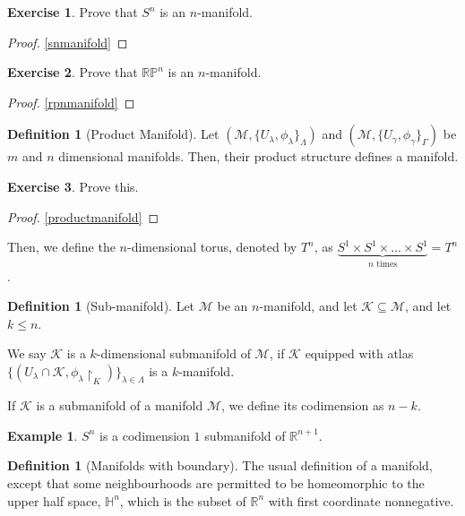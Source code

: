\documentclass[12pt]{report}
\theoremstyle{definition}
\newtheorem{example}[thm]{Example}
\newtheorem{defn}[thm]{Definition}
\newtheorem*{exercise}{Exercise}
\newcommand{\bb}[1]{\mathbb{#1}}
\renewcommand{\cal}[1]{\mathcal{#1}}
\begin{document}
\begin{exercise}
Prove that $S^n$ is an $n$-manifold.
\end{exercise}
\begin{proof}
\ref{snmanifold}
\end{proof}

\begin{exercise}
Prove that $\bb{RP}^n$ is an $n$-manifold.
\end{exercise}
\begin{proof}
\ref{rpnmanifold}
\end{proof}
\begin{defn}[Product Manifold]
Let $(\cal{M}, \{U_\lambda, \phi_\lambda\}_{\Lambda})$ and $(\cal{M}, \{U_\gamma, \phi_\gamma\}_{\Gamma})$ be $m$ and $n$ dimensional manifolds. 
Then, their product structure defines a manifold.
\end{defn}

\begin{exercise}
Prove this.

\begin{proof}
\ref{productmanifold}
\end{proof}
\end{exercise}

Then, we define the $n$-dimensional torus, denoted by $T^n$, as $\underbrace{S^1 \times S^1 \times  \dots \times S^1}_{n \text{ times}} = T^n$.

\begin{defn}[Sub-manifold]
Let $\cal{M}$ be an $n$-manifold, and let $\cal{K} \subseteq \cal{M}$, and let $k \leq n$.

We say $\cal{K}$ is a $k$-dimensional submanifold of $\cal{M}$, if $\cal{K}$ equipped with atlas $\{(U_{\lambda} \cap \cal{K}, \phi_{\lambda}\restriction_{K})\}_{\lambda \in \Lambda}$ is a $k$-manifold.
\end{defn}

If $\cal{K}$ is a submanifold of a manifold $\cal{M}$, we define its codimension as $n-k$. 
\begin{example}
$S^n$ is a codimension $1$ submanifold of $\bb{R}^{n+1}$.
\end{example}

\begin{defn}[Manifolds with boundary]
The usual definition of a manifold, except that some neighbourhoods are permitted to be homeomorphic to the upper half space, $\bb{H}^n$, which is the subset of $\bb{R}^n$ with first coordinate nonnegative. 
\end{defn}
\end{document}
